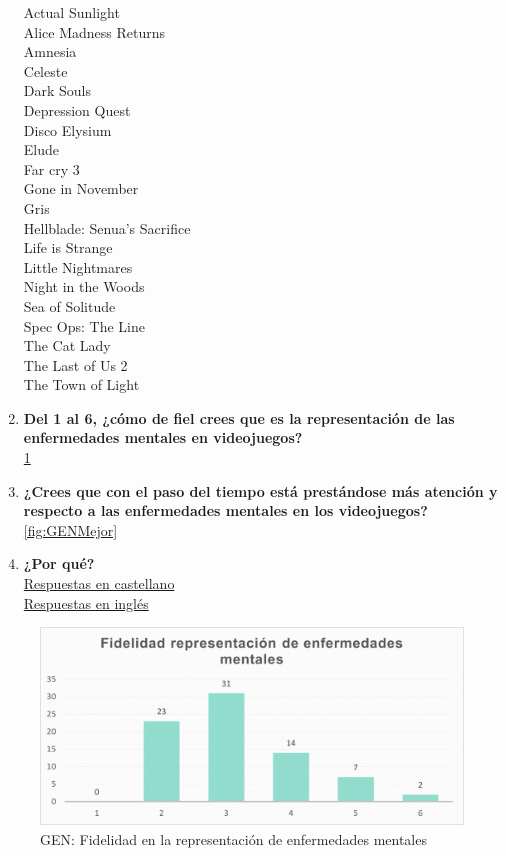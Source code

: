 \documentclass[12pt, a4paper,twoside,titlepage]{book}
\begin{document}
\begin{enumerate}[label=\textbf{\arabic*}.]
    Actual Sunlight \\
    Alice Madness Returns\\
    Amnesia\\
    Celeste\\
    Dark Souls\\
    Depression Quest \\
    Disco Elysium\\
    Elude\\
    Far cry 3\\
    Gone in November\\
    Gris\\
    Hellblade: Senua’s Sacrifice\\
    Life is Strange\\
    Little Nightmares\\
    Night in the Woods\\
    Sea of Solitude\\
    Spec Ops: The Line\\
    The Cat Lady\\
    The Last of Us 2\\
    The Town of Light\\

     \item \textbf{Del 1 al 6, ¿cómo de fiel crees que es la representación de las enfermedades mentales en videojuegos?}\\
     \ref{fig:GENFidel}
     \item \textbf{¿Crees que con el paso del tiempo está prestándose más atención y respecto a las enfermedades mentales en los videojuegos?}\\
     \ref{fig:GENMejor}
     \item \textbf{¿Por qué? }\\
     \hyperref[mejorCastellano]{Respuestas en castellano}\\
     \hyperref[mejorIngles]{Respuestas en inglés}
\end{enumerate}



\begin{figure}
    \centering
    \includegraphics[width=.8\linewidth]{ANEXO Gen/19AnexGENFid}
    \caption{GEN: Fidelidad en la representación de enfermedades mentales}
    \label{fig:GENFidel}
\end{figure}
\end{document}
